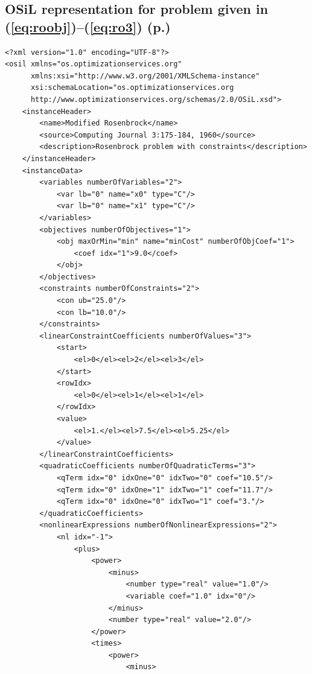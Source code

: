 \documentclass[11pt]{article}
\renewcommand{\_}{{\char"5F}}
\renewcommand{\{}{{\char"7B}}
\renewcommand{\}}{{\char"7D}}
\renewcommand{\^}{{\char"0D}}
\renewcommand{\'}{{\char"0D}}
\begin{document}
\begin{enumerate}[Step 1:]
\subsection{OSiL representation for problem given in (\ref{eq:roobj})--(\ref{eq:ro3}) (p.\pageref{eq:roobj})}\label{section:rosenbrockXML}


{\normalsize \baselineskip 16pt \vspace{2pt}
\begin{verbatim}
<?xml version="1.0" encoding="UTF-8"?>
<osil xmlns="os.optimizationservices.org"
      xmlns:xsi="http://www.w3.org/2001/XMLSchema-instance"
      xsi:schemaLocation="os.optimizationservices.org
      http://www.optimizationservices.org/schemas/2.0/OSiL.xsd">
    <instanceHeader>
        <name>Modified Rosenbrock</name>
        <source>Computing Journal 3:175-184, 1960</source>
        <description>Rosenbrock problem with constraints</description>
    </instanceHeader>
    <instanceData>
        <variables numberOfVariables="2">
            <var lb="0" name="x0" type="C"/>
            <var lb="0" name="x1" type="C"/>
        </variables>
        <objectives numberOfObjectives="1">
            <obj maxOrMin="min" name="minCost" numberOfObjCoef="1">
                <coef idx="1">9.0</coef>
            </obj>
        </objectives>
        <constraints numberOfConstraints="2">
            <con ub="25.0"/>
            <con lb="10.0"/>
        </constraints>
        <linearConstraintCoefficients numberOfValues="3">
            <start>
                <el>0</el><el>2</el><el>3</el>
            </start>
            <rowIdx>
                <el>0</el><el>1</el><el>1</el>
            </rowIdx>
            <value>
                <el>1.</el><el>7.5</el><el>5.25</el>
            </value>
        </linearConstraintCoefficients>
        <quadraticCoefficients numberOfQuadraticTerms="3">
            <qTerm idx="0" idxOne="0" idxTwo="0" coef="10.5"/>
            <qTerm idx="0" idxOne="1" idxTwo="1" coef="11.7"/>
            <qTerm idx="0" idxOne="0" idxTwo="1" coef="3."/>
        </quadraticCoefficients>
        <nonlinearExpressions numberOfNonlinearExpressions="2">
            <nl idx="-1">
                <plus>
                    <power>
                        <minus>
                            <number type="real" value="1.0"/>
                            <variable coef="1.0" idx="0"/>
                        </minus>
                        <number type="real" value="2.0"/>
                    </power>
                    <times>
                        <power>
                            <minus>

\end{verbatim}}
\end{enumerate}
\end{document}
